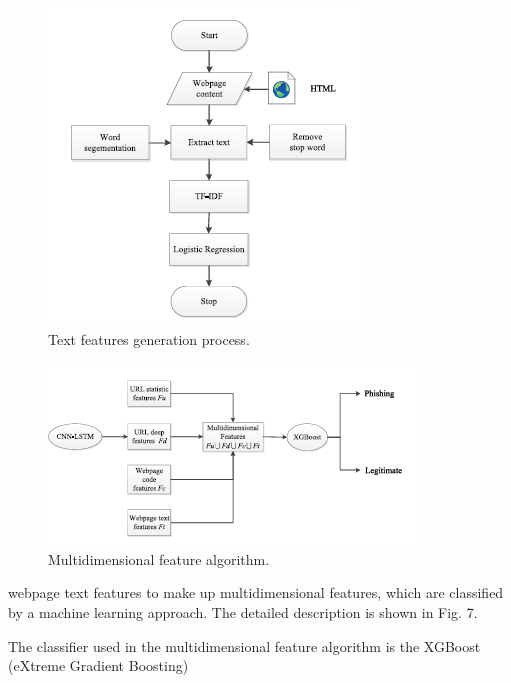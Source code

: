 \documentclass{ieeeaccess}
\begin{document}
\begin{figure}
    \centering
    \includegraphics[width=\linewidth]{figure6.png}
    \caption{Text features generation process.}
    \label{fig:6}
\end{figure}
\begin{figure}
    \centering
    \includegraphics[width=\linewidth]{figure7.png}
    \caption{Multidimensional feature algorithm.}
    \label{fig:7}
\end{figure}
webpage text features to make up multidimensional features,
which are classified by a machine learning approach. The
detailed description is shown in Fig. 7.
\par The classifier used in the multidimensional feature
algorithm is the XGBoost (eXtreme Gradient Boosting)
\end{document}
